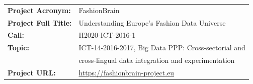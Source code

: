 \clearpage


\setlength{\headheight}{1cm}
\setlength{\footskip}{18mm}
\addtolength{\textheight}{-\footskip} \pagestyle{empty}
\onlypnum

\begin{flushleft}
  \begin{tabular}{ll}
    \textbf{Project Acronym:}       &   FashionBrain \\
    \textbf{Project Full Title:}    &   Understanding Europe's Fashion Data Universe  \\
    \textbf{Call:}                  &   H2020-ICT-2016-1 \\ 
    \textbf{Topic:}                 &   ICT-14-2016-2017, Big Data PPP: Cross-sectorial and \\
& cross-lingual data integration and experimentation  \\
    \textbf{Project URL:}           &  \url{https://fashionbrain-project.eu} 
  \end{tabular}



\newcommand\Tstrut{\rule{0pt}{2.6ex}}         %
\newcommand\Bstrut{\rule[-0.9ex]{0pt}{0pt}}   %




\end{flushleft}
